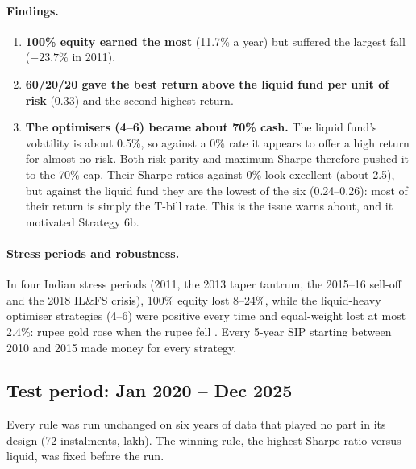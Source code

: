 \paragraph{Findings.}
\begin{enumerate}
  \item \textbf{100\% equity earned the most} (11.7\% a year) but suffered the largest fall
        ($-23.7\%$ in 2011).
  \item \textbf{60/20/20 gave the best return above the liquid fund per unit of risk} (0.33) and the
        second-highest return.
  \item \textbf{The optimisers (4--6) became about 70\% cash.} The liquid fund's volatility is
        about 0.5\%, so against a 0\% rate it appears to offer a high return for almost no risk. Both
        risk parity and maximum Sharpe therefore pushed it to the 70\% cap. Their Sharpe ratios
        against 0\% look excellent (about 2.5), but against the liquid fund they are the lowest of
        the six (0.24--0.26): most of their return is simply the T-bill rate. This is the issue
        \citet{sharpe1994} warns about, and it motivated Strategy 6b.
\end{enumerate}

\paragraph{Stress periods and robustness.} In four Indian stress periods (2011, the 2013 taper tantrum, the 2015--16 sell-off and the 2018 IL\&FS crisis), 100\% equity lost 8--24\%, while the liquid-heavy optimiser strategies (4--6) were positive every time and equal-weight lost at most 2.4\%: rupee gold rose when the rupee fell \citep{baur2010}. Every 5-year SIP starting between 2010 and 2015 made money for every strategy.

\subsection{Test period: Jan 2020 -- Dec 2025}
\label{sec:res-2020}

Every rule was run unchanged on six years of data that played no part in its design (72
instalments,  lakh). The winning rule, the highest Sharpe ratio versus liquid, was fixed before
the run.

